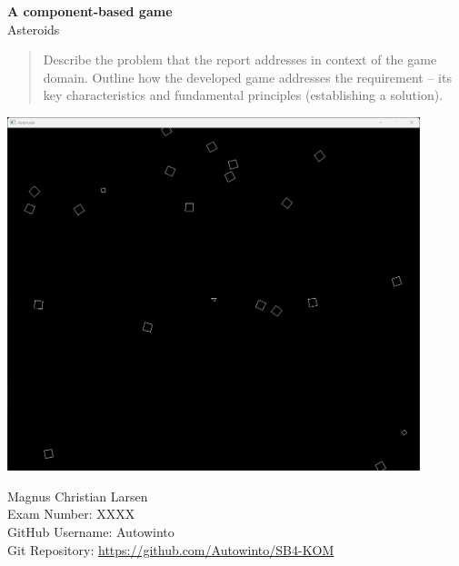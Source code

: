 \begin{titlepage}
	\begin{center}
		\vspace*{1cm}
		\Huge
		\textbf{A component-based game}
		\vspace{0.5cm} \\
		\LARGE
		Asteroids
		\begin{abstract}
			Describe the problem that the report addresses in context of the
			game domain.
			Outline how the developed game addresses the requirement – its key
			characteristics and fundamental principles
			(establishing a solution).

		\end{abstract}
		\includegraphics[width=12cm]{images/Asteroids}
	\end{center}

	\begin{center}
		Magnus Christian Larsen\\
		Exam Number: XXXX\\
		GitHub Username: Autowinto\\
		Git Repository: \url{https://github.com/Autowinto/SB4-KOM}\\
	\end{center}
\end{titlepage}